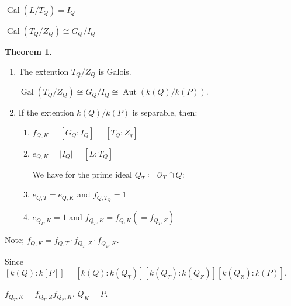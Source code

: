 \documentclass[openany]{amsbook}
\numberwithin{section}{chapter}
\theoremstyle{definition}
\newtheorem{theorem}{Theorem}[chapter]
\begin{document}
\(\operatorname{Gal} (L / T_Q) = I_Q\) 

\(\operatorname{Gal} (T_Q / Z_Q) \cong G_Q / I_Q\) 

\begin{theorem}

    \begin{enumerate}[label=\roman*)]
        \item The extention \(T_Q / Z_Q\) is Galois.
        
        \(\operatorname{Gal}(T_Q / Z_Q) \cong G_Q / I_Q \cong \operatorname{Aut} (k(Q) / k(P))\).
        \item If the extention \(k(Q) / k(P)\) is separable, then:
        \begin{enumerate}[label=\alph*)]
            \item \(f_{Q,K} = [G_Q : I_Q] = [T_Q : Z_q]\) 
            \item \(e_{Q,K} = \vert I_Q \vert = [L:T_Q]\)  
            
            We have for the prime ideal \(Q_T \coloneqq \mathcal{O}_T \cap Q\):

            \item \(e_{Q,T} = e_{Q,K}\) and \(f_{Q, T_Q} = 1\) 
            \item \(e_{Q_T, K} = 1\) and \(f_{Q_T, K} = f_{Q,K} (=f_{Q_T, Z})\)
        \end{enumerate} 
    \end{enumerate} 
\end{theorem}

Note; \(f_{Q,K} = f_{Q,T} \cdot f_{Q_T, Z} \cdot f_{Q_Z, K}\).

Since \([k(Q):k[P]] = [k(Q) : k(Q_T)] [k(Q_T):k(Q_Z)][k(Q_Z):k(P)]\).

\(f_{Q_T,K} = f_{Q_T,Z} f_{Q_Z,K}\), \(Q_K = P\).
\end{document}
